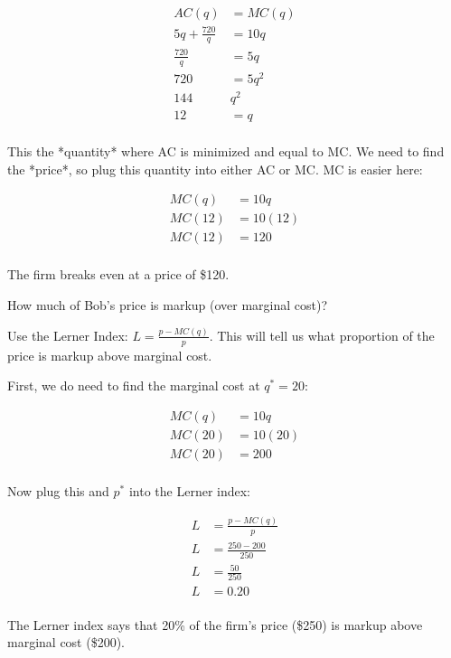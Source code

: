 \documentclass[12 pt]{exam}
\begin{document}
\begin{questions}
\begin{solution}
\begin{align*}
AC(q)&=MC(q)\\
5q+\frac{720}{q}&=10q\\
\frac{720}{q}&=5q\\
720&=5q^2\\
144&q^2\\
12&=q\\
\end{align*}

This the *quantity* where AC is minimized and equal to MC. We need to find the *price*, so plug this quantity into either AC or MC. MC is easier here:

\begin{align*}
MC(q)&=10q\\
MC(12)&=10(12)\\
MC(12)&=120\\
\end{align*}

The firm breaks even at a price of \$120.
\end{solution}
	
\question How much of Bob's price is markup (over marginal cost)?

\begin{solution}

Use the Lerner Index: $L=\frac{p-MC(q)}{p}$. This will tell us what proportion of the price is markup above marginal cost.

First, we do need to find the marginal cost at $q^*=20$:

\begin{align*}
MC(q)&=10q\\
MC(20)&=10(20)\\
MC(20)&=200\\
\end{align*}

Now plug this and $p^*$ into the Lerner index:

\begin{align*}
L &= \frac{p-MC(q)}{p}\\
L &= \frac{250-200}{250}\\
L &=\frac{50}{250}\\
L &= 0.20\\
\end{align*}

The Lerner index says that 20\% of the firm's price (\$250) is markup above marginal cost (\$200).

\end{solution}


\end{questions}
\end{document}
